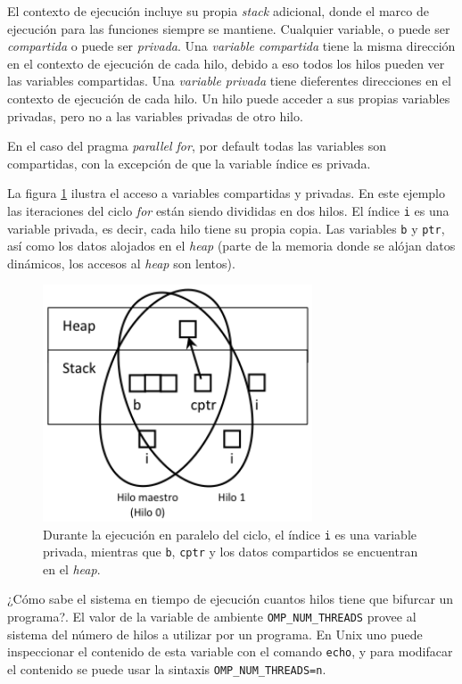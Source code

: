 \documentclass[12pt,letterpaper]{book}
\begin{document}
El contexto de ejecución incluye su propia \textit{stack} adicional, donde el marco de ejecución para las funciones siempre se mantiene. Cualquier variable, o puede ser \textit{compartida} o puede ser \textit{privada}. Una \textit{variable compartida} tiene la misma dirección en el contexto de ejecución de cada hilo, debido a eso todos los hilos pueden ver las variables compartidas. Una \textit{variable privada} tiene dieferentes direcciones en el contexto de ejecución de cada hilo. Un hilo puede acceder a sus propias variables privadas, pero no  a las variables privadas de otro hilo.

En el caso del pragma \textit{parallel for}, por default todas las variables son compartidas, con la excepción de que la variable índice es privada.

La figura \ref{fig:var_shared_private} ilustra el acceso a variables compartidas y privadas. En este ejemplo las iteraciones del ciclo \textit{for} están siendo divididas en dos hilos. El índice \texttt{i} es una variable privada, es decir, cada hilo tiene su propia copia. Las variables \texttt{b} y \texttt{ptr}, así como los datos alojados en el \textit{heap} (parte de la memoria donde se alójan datos dinámicos, los accesos al \textit{heap} son lentos). 

\begin{figure}
\begin{center}
\includegraphics[width=8cm]{../imagenes/vars_share_private.png} 
\end{center}
\caption{Durante la ejecución en paralelo del ciclo, el índice \texttt{i} es una variable privada, mientras que \texttt{b}, \texttt{cptr} y los datos compartidos se encuentran en el \textit{heap}.}
\label{fig:var_shared_private}
\end{figure}

¿Cómo sabe el sistema en tiempo de ejecución cuantos hilos tiene que bifurcar un programa?. El valor de la variable de ambiente \texttt{OMP\_NUM\_THREADS} provee al sistema del número de hilos a utilizar por un programa. En Unix uno puede inspeccionar el contenido de esta variable con el comando \texttt{echo}, y para modifacar el contenido se puede usar la sintaxis \texttt{OMP\_NUM\_THREADS=n}.
\end{document}
